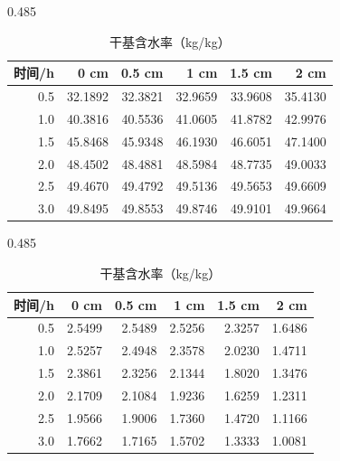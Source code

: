 \begin{table}[htbp]
  \centering
  \caption{三小时内药材温湿分布}
  \label{tab:q2-results}
  \begin{subtable}[t]{0.485\textwidth}
    \centering
    \caption{温度（$^\circ$C）}
    \label{tab:q2_temperature}
    \fontsize{8.2pt}{10.5pt}\selectfont
    \setlength{\tabcolsep}{2.4pt}
    \begin{tabular}{@{}rrrrrr@{}}
      \toprule
      时间/h & 0 cm & 0.5 cm & 1 cm & 1.5 cm & 2 cm \\
      \midrule
      0.5 & 32.1892 & 32.3821 & 32.9659 & 33.9608 & 35.4130 \\
      1.0 & 40.3816 & 40.5536 & 41.0605 & 41.8782 & 42.9976 \\
      1.5 & 45.8468 & 45.9348 & 46.1930 & 46.6051 & 47.1400 \\
      2.0 & 48.4502 & 48.4881 & 48.5984 & 48.7735 & 49.0033 \\
      2.5 & 49.4670 & 49.4792 & 49.5136 & 49.5653 & 49.6609 \\
      3.0 & 49.8495 & 49.8553 & 49.8746 & 49.9101 & 49.9664 \\
      \bottomrule
    \end{tabular}
  \end{subtable}\hfill
  \begin{subtable}[t]{0.485\textwidth}
    \centering
    \caption{干基含水率（kg/kg）}
    \label{tab:q2_moisture}
    \fontsize{8.2pt}{10.5pt}\selectfont
    \setlength{\tabcolsep}{2.4pt}
    \begin{tabular}{@{}rrrrrr@{}}
      \toprule
      时间/h & 0 cm & 0.5 cm & 1 cm & 1.5 cm & 2 cm \\
      \midrule
      0.5 & 2.5499 & 2.5489 & 2.5256 & 2.3257 & 1.6486 \\
      1.0 & 2.5257 & 2.4948 & 2.3578 & 2.0230 & 1.4711 \\
      1.5 & 2.3861 & 2.3256 & 2.1344 & 1.8020 & 1.3476 \\
      2.0 & 2.1709 & 2.1084 & 1.9236 & 1.6259 & 1.2311 \\
      2.5 & 1.9566 & 1.9006 & 1.7360 & 1.4720 & 1.1166 \\
      3.0 & 1.7662 & 1.7165 & 1.5702 & 1.3333 & 1.0081 \\
      \bottomrule
    \end{tabular}
  \end{subtable}
\end{table}
